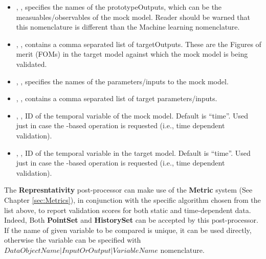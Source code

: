 \begin{itemize}
  \item {}, , specifies the names of  the prototypeOutputs, which can be the measuables/observables of the mock model. Reader should be warned that this nomenclature is different than the Machine learning nomenclature.

  \item {}, , contains a comma separated list of
     targetOutputs. These are the Figures of merit (FOMs) in the target model against which the mock model is being validated.

    \item {}, , specifies the names of  the parameters/inputs to the mock model.

    \item {}, , contains a comma separated list of
    target parameters/inputs.

        \item {},  , ID of the temporal variable of the mock model. Default is ``time''.
        \nb Used just in case the  -based operation  is requested (i.e., time dependent validation).
        \item {}, , ID of the temporal variable in the target model. Default is ``time''.
        \nb Used just in case the  -based operation  is requested (i.e., time dependent validation).
\end{itemize}


The \textbf{Represntativity} post-processor can make use of the \textbf{Metric} system (See Chapter \ref{sec:Metrics}),
in conjunction with the specific algorithm chosen from the list above,
to report validation scores for both static and time-dependent data.
Indeed, Both \textbf{PointSet} and \textbf{HistorySet} can be accepted by this post-processor.
If the name of given variable to be compared is unique, it can be used directly, otherwise the variable can be specified
with $DataObjectName|InputOrOutput|VariableName$ nomenclature.

